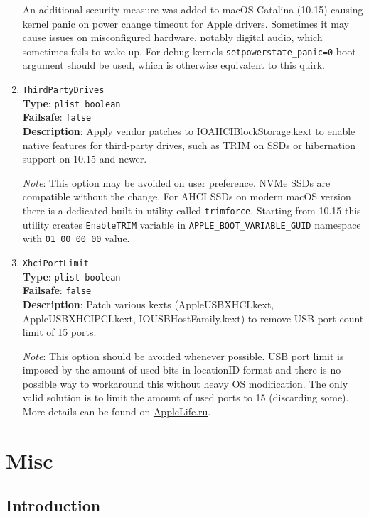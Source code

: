 \documentclass[]{article}
\makeatletter
\renewcommand{\label}[1]{%
\zref@wrapper@immediate{\oldlabel{#1}}}  %
\makeatother
\begin{document}
\begin{enumerate}
  An additional security measure was added to macOS Catalina (10.15) causing
  kernel panic on power change timeout for Apple drivers. Sometimes it may cause
  issues on misconfigured hardware, notably digital audio, which sometimes fails
  to wake up. For debug kernels \texttt{setpowerstate\_panic=0} boot argument
  should be used, which is otherwise equivalent to this quirk.

\item
  \texttt{ThirdPartyDrives}\\
  \textbf{Type}: \texttt{plist\ boolean}\\
  \textbf{Failsafe}: \texttt{false}\\
  \textbf{Description}: Apply vendor patches to IOAHCIBlockStorage.kext to enable
  native features for third-party drives, such as TRIM on SSDs or hibernation
  support on 10.15 and newer.

  \emph{Note}: This option may be avoided on user preference. NVMe SSDs are
  compatible without the change. For AHCI SSDs on modern macOS version there
  is a dedicated built-in utility called \texttt{trimforce}. Starting from 10.15
  this utility creates \texttt{EnableTRIM} variable in \texttt{APPLE\_BOOT\_VARIABLE\_GUID}
  namespace with \texttt{01 00 00 00} value.

\item
  \texttt{XhciPortLimit}\\
  \textbf{Type}: \texttt{plist\ boolean}\\
  \textbf{Failsafe}: \texttt{false}\\
  \textbf{Description}: Patch various kexts (AppleUSBXHCI.kext, AppleUSBXHCIPCI.kext,
  IOUSBHostFamily.kext) to remove USB port count limit of 15 ports.

  \emph{Note}: This option should be avoided whenever possible. USB port limit
  is imposed by the amount of used bits in locationID format and there is no
  possible way to workaround this without heavy OS modification. The only
  valid solution is to limit the amount of used ports to 15 (discarding some).
  More details can be found on \href{https://applelife.ru/posts/550233}{AppleLife.ru}.

\end{enumerate}

\section{Misc}\label{misc}

\subsection{Introduction}\label{miscintro}
\end{document}
